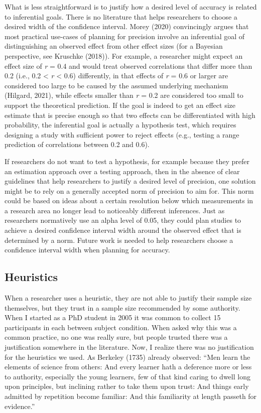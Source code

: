 \documentclass[
  english,
  ,jou,floatsintext]{apa6}
\begin{document}
What is less straightforward is to justify how a desired level of accuracy is related to inferential goals. There is no literature that helps researchers to choose a desired width of the confidence interval. Morey (2020) convincingly argues that most practical use-cases of planning for precision involve an inferential goal of distinguishing an observed effect from other effect sizes (for a Bayesian perspective, see Kruschke (2018)). For example, a researcher might expect an effect size of \emph{r} = 0.4 and would treat observed correlations that differ more than 0.2 (i.e., 0.2 \textless{} \emph{r} \textless{} 0.6) differently, in that effects of \emph{r} = 0.6 or larger are considered too large to be caused by the assumed underlying mechanism (Hilgard, 2021), while effects smaller than \emph{r} = 0.2 are considered too small to support the theoretical prediction. If the goal is indeed to get an effect size estimate that is precise enough so that two effects can be differentiated with high probability, the inferential goal is actually a hypothesis test, which requires designing a study with sufficient power to reject effects (e.g., testing a range prediction of correlations between 0.2 and 0.6).

If researchers do not want to test a hypothesis, for example because they prefer an estimation approach over a testing approach, then in the absence of clear guidelines that help researchers to justify a desired level of precision, one solution might be to rely on a generally accepted norm of precision to aim for. This norm could be based on ideas about a certain resolution below which measurements in a research area no longer lead to noticeably different inferences. Just as researchers normatively use an alpha level of 0.05, they could plan studies to achieve a desired confidence interval width around the observed effect that is determined by a norm. Future work is needed to help researchers choose a confidence interval width when planning for accuracy.

\hypertarget{heuristics}{%
\subsection{Heuristics}\label{heuristics}}

When a researcher uses a heuristic, they are not able to justify their sample size themselves, but they trust in a sample size recommended by some authority. When I started as a PhD student in 2005 it was common to collect 15 participants in each between subject condition. When asked why this was a common practice, no one was really sure, but people trusted there was a justification somewhere in the literature. Now, I realize there was no justification for the heuristics we used. As Berkeley (1735) already observed: ``Men learn the elements of science from others: And every learner hath a deference more or less to authority, especially the young learners, few of that kind caring to dwell long upon principles, but inclining rather to take them upon trust: And things early admitted by repetition become familiar: And this familiarity at length passeth for evidence.''
\end{document}
